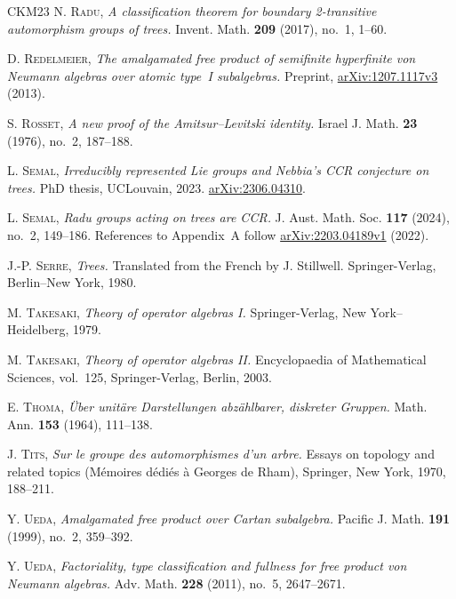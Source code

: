\documentclass[11pt]{amsart}
\numberwithin{equation}{section}
\theoremstyle{definition}
\begin{document}
\begin{thebibliography}{CKM23}
     \textsc{N. Radu}, \textit{A classification theorem for boundary 2-transitive automorphism groups of trees.} Invent. Math. \textbf{209} (2017), no.~1, 1--60.

     \textsc{D. Redelmeier}, \textit{The amalgamated free product of semifinite hyperfinite von Neumann algebras over atomic type~\textup{I} subalgebras.} Preprint, \href{https://arxiv.org/abs/1207.1117v3}{arXiv:1207.1117v3} (2013).

     \textsc{S. Rosset}, \textit{A new proof of the Amitsur--Levitski identity.} Israel J. Math. \textbf{23} (1976), no.~2, 187--188.

     \textsc{L. Semal}, \textit{Irreducibly represented Lie groups and Nebbia's CCR conjecture on trees.} PhD thesis, UCLouvain, 2023. \href{https://arxiv.org/abs/2306.04310}{arXiv:2306.04310}.

     \textsc{L. Semal}, \textit{Radu groups acting on trees are \textup{CCR}.} J. Aust. Math. Soc. \textbf{117} (2024), no.~2, 149--186. References to Appendix~A follow \href{https://arxiv.org/abs/2203.04189v1}{arXiv:2203.04189v1} (2022).

     \textsc{J.-P. Serre}, \textit{Trees.} Translated from the French by J. Stillwell. Springer-Verlag, Berlin--New York, 1980.

     \textsc{M. Takesaki}, \textit{Theory of operator algebras {\rm I}.} Springer-Verlag, New York--Heidelberg, 1979.

     \textsc{M. Takesaki}, \textit{Theory of operator algebras {\rm II}.} Encyclopaedia of Mathematical Sciences, vol.~125, Springer-Verlag, Berlin, 2003.

     \textsc{E. Thoma}, \textit{\"Uber unit\"are Darstellungen abz\"ahlbarer, diskreter Gruppen.} Math. Ann. \textbf{153} (1964), 111--138.

     \textsc{J. Tits}, \textit{Sur le groupe des automorphismes d'un arbre.} Essays on topology and related topics (M\'emoires d\'edi\'es \`a Georges de Rham), Springer, New York, 1970, 188--211.

     \textsc{Y. Ueda}, \textit{Amalgamated free product over Cartan subalgebra.} Pacific J. Math. \textbf{191} (1999), no.~2, 359--392.

     \textsc{Y. Ueda}, \textit{Factoriality, type classification and fullness for free product von Neumann algebras.} Adv. Math. \textbf{228} (2011), no.~5, 2647--2671.


\end{thebibliography}
\end{document}

